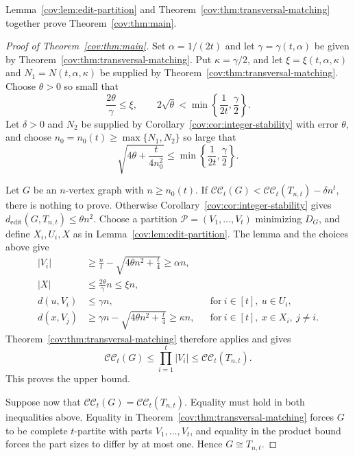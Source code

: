 \documentclass[11pt]{article}
\numberwithin{equation}{section}
\theoremstyle{remark}
\newcommand{\CC}{\mathcal{CC}}
\newcommand{\ed}{d_{\mathrm{edit}}}
\begin{document}
Lemma~\ref{cov:lem:edit-partition} and Theorem~\ref{cov:thm:transversal-matching} together prove Theorem~\ref{cov:thm:main}.

\begin{proof}[Proof of Theorem~\ref{cov:thm:main}]
Set \(\alpha=1/(2t)\) and let \(\gamma=\gamma(t,\alpha)\) be given by Theorem~\ref{cov:thm:transversal-matching}.
Put \(\kappa=\gamma/2\), and let \(\xi=\xi(t,\alpha,\kappa)\) and \(N_1=N(t,\alpha,\kappa)\) be supplied by
Theorem~\ref{cov:thm:transversal-matching}. Choose \(\theta>0\) so small that
\begin{equation*}
\frac{2\theta}{\gamma}\le\xi,
\qquad
2\sqrt{\theta}<\min\left\{\frac1{2t},\frac{\gamma}{2}\right\}.
\end{equation*}
Let \(\delta>0\) and \(N_2\) be supplied by Corollary~\ref{cov:cor:integer-stability} with error \(\theta\),
and choose \(n_0=n_0(t)\ge\max\{N_1,N_2\}\) so large that
\begin{equation*}
\sqrt{4\theta+\frac{t}{4n_0^2}}
 \le \min\left\{\frac1{2t},\frac{\gamma}{2}\right\}.
\end{equation*}

Let \(G\) be an \(n\)-vertex graph with \(n\ge n_0(t)\).  If \(\CC_t(G)<\CC_t(T_{n,t})-\delta n^t\),
there is nothing to prove.  Otherwise Corollary~\ref{cov:cor:integer-stability} gives \(\ed(G,T_{n,t})\le\theta n^2\).
Choose a partition \(\mathcal P=(V_1,\ldots,V_t)\) minimizing \(D_G\),
and define \(X_i,U_i,X\) as in Lemma~\ref{cov:lem:edit-partition}. The lemma and the choices above give
\begin{align*}
|V_i|&\ge\frac nt-\sqrt{4\theta n^2+\frac t4}\ge\alpha n,\\
|X|&\le\frac{2\theta}{\gamma}n\le\xi n,\\
d(u,V_i)&\le\gamma n, && \mathrm{for\ } i\in [t],\ u\in U_i,\\
d(x,V_j)&\ge\gamma n-\sqrt{4\theta n^2+\frac t4}\ge\kappa n,
 && \mathrm{for\ } i\in [t],\ x\in X_i,\ j\ne i.
\end{align*}
Theorem~\ref{cov:thm:transversal-matching} therefore applies and gives
\begin{equation*}
\CC_t(G)
 \le \prod_{i=1}^t|V_i|
 \le \CC_t(T_{n,t}).
\end{equation*}
This proves the upper bound.

Suppose now that \(\CC_t(G)=\CC_t(T_{n,t})\). Equality must hold in both inequalities above. 
Equality in Theorem~\ref{cov:thm:transversal-matching} forces \(G\) to be complete \(t\)-partite with parts \(V_1,\ldots,V_t\),
and equality in the product bound forces the part sizes to differ by at most one. Hence \(G\cong T_{n,t}\).
\end{proof}
\end{document}
